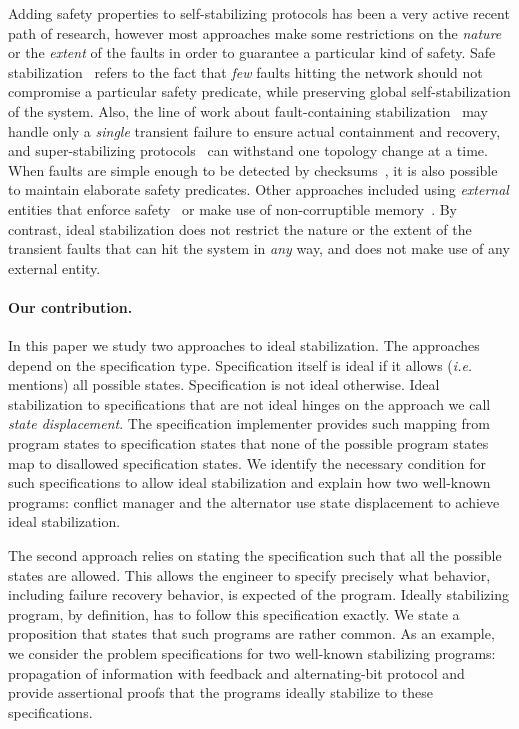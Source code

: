 \documentclass[11pt]{llncs}
\begin{document}
Adding safety properties to self-stabilizing protocols has been a very
active recent path of research, however most approaches make some
restrictions on the \emph{nature} or the \emph{extent} of the faults
in order to guarantee a particular kind of safety. Safe
stabilization~\cite{GB03c,BGR06c} refers to the fact that \emph{few}
faults hitting the network should not compromise a particular safety
predicate, while preserving global self-stabilization of the
system. Also, the line of work about fault-containing
stabilization~\cite{GGHP96c} may handle only a \emph{single} transient
failure to ensure actual containment and recovery, and
super-stabilizing protocols~\cite{DH97j} can withstand one topology
change at a time. When faults are simple enough to be detected by
checksums~\cite{HP00j}, it is also possible to maintain elaborate
safety predicates. Other approaches included using \emph{external}
entities that enforce safety~\cite{DS03j} or make use of
non-corruptible memory~\cite{LS92c}. By contrast, ideal stabilization
does not restrict the nature or the extent of the transient faults
that can hit the system in \emph{any} way, and does not make use of
any external entity.

\paragraph{Our contribution.}

In this paper we study two approaches to ideal stabilization. The
approaches depend on the specification type. Specification itself is
ideal if it allows (\emph{i.e.} mentions) all possible
states. Specification is not ideal otherwise. Ideal stabilization to
specifications that are not ideal hinges on the approach we call
\emph{state displacement}. The specification implementer provides such
mapping from program states to specification states that none of the
possible program states map to disallowed specification states.  We
identify the necessary condition for such specifications to allow
ideal stabilization and explain how two well-known programs: conflict
manager and the alternator use state displacement to achieve ideal
stabilization.

The second approach relies on stating the specification such that all
the possible states are allowed. This allows the engineer to specify
precisely what behavior, including failure recovery behavior, is
expected of the program. Ideally stabilizing program, by definition, has
to follow this specification exactly. We state a proposition that
states that such programs are rather common. As an example, we consider
the problem specifications for two well-known stabilizing programs:
propagation of information with feedback and alternating-bit protocol
and provide assertional proofs that the programs ideally stabilize to
these specifications.
\end{document}

